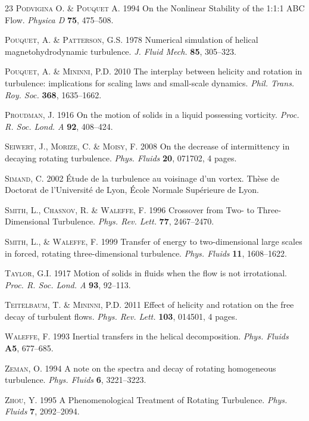 \documentclass[aps,amsmath,amssymb,floatfix,showpacs]{revtex4}
\begin{document}
\begin{thebibliography}{23}
\textsc{Podvigina O. \& Pouquet A.}
1994 On the Nonlinear Stability of the 1:1:1 ABC Flow.
{\em Physica D\/} {\bf 75}, 475--508.

\textsc{Pouquet, A. \& Patterson, G.S.}
1978 Numerical simulation of helical magnetohydrodynamic turbulence.
\emph{J. Fluid Mech.} \textbf{85}, 305--323.

\textsc{Pouquet, A. \& Mininni, P.D.}
2010 The interplay between helicity and rotation in turbulence: implications for scaling laws and small-scale dynamics.
\emph{Phil. Trans. Roy. Soc.} \textbf{368}, 1635--1662.

\textsc{Proudman, J.}
1916 On the motion of solids in a liquid possessing vorticity.
\emph{Proc. R. Soc. Lond. A} \textbf{92}, 408--424.

\textsc{Seiwert, J., Morize, C. \& Moisy, F.}
2008 On the decrease of intermittency in decaying rotating turbulence.
\emph{Phys. Fluids} \textbf{20}, 071702, 4 pages.

\textsc{Simand, C.} 2002 \'Etude de la turbulence au voisinage d'un vortex. Th\`ese de Doctorat de l'Universit\'e de Lyon, \'Ecole Normale Sup\'erieure de Lyon.

\textsc{Smith, L., Chasnov, R. \& Waleffe, F.}
1996 Crossover from Two- to Three-Dimensional Turbulence. 
\emph{Phys. Rev. Lett.} \textbf{77}, 2467--2470.

\textsc{Smith, L., \& Waleffe, F.}
1999 Transfer of energy to two-dimensional large scales in forced, rotating three-dimensional turbulence.
\emph{Phys. Fluids} \textbf{11}, 1608--1622.

\textsc{Taylor, G.I.}
1917 Motion of solids in fluids when the flow is not irrotational.
\emph{Proc. R. Soc. Lond. A} \textbf{93}, 92--113. 

\textsc{Teitelbaum, T. \& Mininni, P.D.}
2011 Effect of helicity and rotation on the free decay of turbulent flows.
\emph{Phys. Rev. Lett.} \textbf{103}, 014501, 4 pages.

\textsc{Waleffe, F.}
1993  Inertial transfers in the helical decomposition.
\emph{Phys. Fluids} \textbf{A5}, 677--685.

\textsc{Zeman, O.}
1994 A note on the spectra and decay of rotating homogeneous turbulence.
\emph{Phys. Fluids} \textbf{6}, 3221--3223.

\textsc{Zhou, Y.}
1995 A Phenomenological Treatment of Rotating Turbulence.
\emph{Phys. Fluids} \textbf{7}, 2092--2094.

\end{thebibliography}
\end{document}
